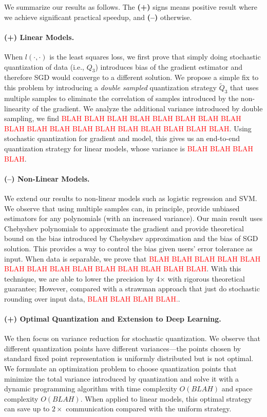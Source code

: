 \documentclass{article}
\begin{document}
We summarize our results as follows. The {\bf (+)}
signs means positive result where we achieve
significant practical speedup, and {\bf (--)} otherwise.

\paragraph{(+) Linear Models.} When $l(\cdot,\cdot)$ is 
the least squares loss, we first prove that
simply doing stochastic quantization of data 
(i.e., $Q_3$) introduces bias of the gradient
estimator and therefore SGD would converge
to a different solution. We propose a simple
fix to this problem by introducing a
{\em double sampled} quantization strategy
$\tilde{Q}_3$ that uses multiple samples to
eliminate the correlation of samples introduced
by the non-linearity of the gradient. We
analyze the additional variance introduced
by double sampling, we find \textcolor{red}{
BLAH BLAH BLAH BLAH BLAH BLAH BLAH BLAH BLAH BLAH BLAH BLAH
BLAH BLAH BLAH BLAH BLAH BLAH}. Using
stochastic quantization for gradient and model,
this gives us an end-to-end quantization strategy
for linear models, whose variance is \textcolor{red}{
BLAH BLAH BLAH BLAH}.

\vspace{-1em}
\paragraph{(--) Non-Linear Models.} We extend our
results to non-linear models such as
logistic regression and SVM. We observe that
using multiple samples can, in principle,
provide unbiased estimators for any polynomials
(with an increased variance). Our main
result uses Chebyshev polynomials to
approximate the gradient and provide theoretical
bound on the bias introduced by Chebyshev
approximation and the bias of SGD solution. 
This provides a way to control the bias given
users' error tolerance as input.  
When data is separable,
we prove that \textcolor{red}{BLAH BLAH 
BLAH BLAH BLAH BLAH BLAH BLAH BLAH BLAH BLAH 
BLAH BLAH BLAH}. With this technique, we are
able to lower the precision by 4$\times$ with
rigorous theoretical guarantee; However,
compared with a strawman approach that just
do stochastic rounding over input data, 
\textcolor{red}{BLAH BLAH BLAH BLAH.}.

\vspace{-1em}
\paragraph{(+) Optimal Quantization and Extension to Deep Learning.}
We then focus on variance reduction for 
stochastic quantization. We observe that different
quantization points have different variances---the points chosen
by standard fixed point representation is uniformly
distributed but is not optimal.
We formulate an optimization problem to choose 
quantization points that minimize the total variance
introduced by quantization and solve it with 
a dynamic programming algorithm with time complexity
$O(BLAH)$ and space complexity $O(BLAH)$.
When applied to linear models, this optimal 
strategy can save up to $2\times$ communication
compared with the uniform strategy.
\end{document}
